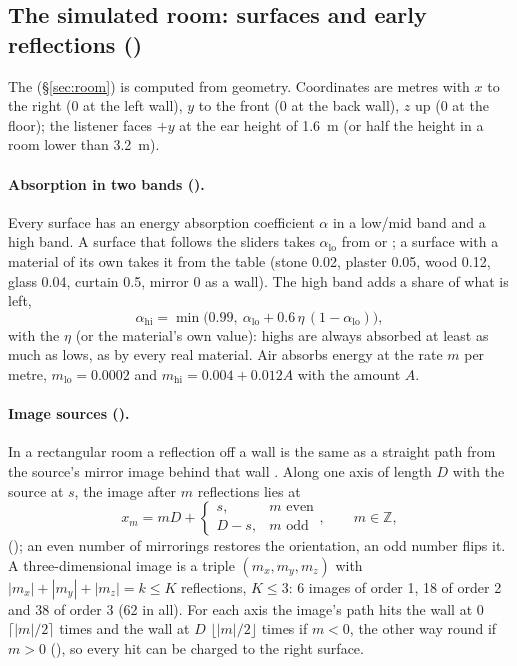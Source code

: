 \subsection{The simulated room: surfaces and early reflections ()}
\label{sec:math-saal}
The  (\S\ref{sec:room}) is computed from geometry. Coordinates are metres with $x$ to the right (0 at the left
wall), $y$ to the front (0 at the back wall), $z$ up (0 at the floor); the listener faces $+y$ at the ear height of
\SI{1.6}{m} (or half the height in a room lower than \SI{3.2}{m}).

\paragraph{Absorption in two bands ().} Every surface has an energy absorption coefficient $\alpha$ in a
low/mid band and a high band. A surface that follows the sliders takes $\alpha_\mathrm{lo}$ from 
or ; a surface with a material of its own takes it from the table (stone 0.02, plaster 0.05, wood 0.12,
glass 0.04, curtain 0.5, mirror 0 as a wall). The high band adds a share of what is left,
\begin{equation}
  \alpha_\mathrm{hi} = \min\bigl(0.99,\ \alpha_\mathrm{lo} + 0.6\,\eta\,(1-\alpha_\mathrm{lo})\bigr),
\end{equation}
with the  $\eta$ (or the material's own value): highs are always absorbed at least as much as
lows, as by every real material. Air absorbs energy at the rate $m$ per metre, $m_\mathrm{lo} = 0.0002$ and
$m_\mathrm{hi} = 0.004 + 0.012A$ with the  amount $A$.

\paragraph{Image sources ().} In a rectangular room a reflection off a wall is the same as a straight
path from the source's mirror image behind that wall \citep{allen1979image}. Along one axis of length $D$ with the
source at $s$, the image after $m$ reflections lies at
\begin{equation}
  x_m = mD + \begin{cases} s, & m \text{ even}\\ D - s, & m\text{ odd}\end{cases},\qquad m\in\mathbb Z,
\end{equation}
(); an even number of mirrorings restores the orientation, an odd number flips it. A three-dimensional
image is a triple $(m_x,m_y,m_z)$ with $|m_x|+|m_y|+|m_z| = k \le K$ reflections, $K\le3$: 6 images of order 1, 18 of
order 2 and 38 of order 3 (62 in all). For each axis the image's path hits the wall at 0 $\lceil |m|/2\rceil$ times
and the wall at $D$ $\lfloor |m|/2\rfloor$ times if $m<0$, the other way round if $m>0$ (), so every hit
can be charged to the right surface.

